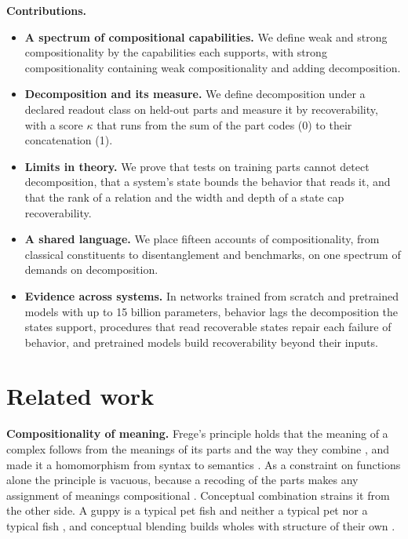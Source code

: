 \textbf{Contributions.}
\begin{itemize}
  \item \textbf{A spectrum of compositional capabilities.} We define weak and strong compositionality by the capabilities each supports, with strong compositionality containing weak compositionality and adding decomposition.
  \item \textbf{Decomposition and its measure.} We define decomposition under a declared readout class on held-out parts and measure it by recoverability, with a score $\kappa$ that runs from the sum of the part codes (0) to their concatenation (1).
  \item \textbf{Limits in theory.} We prove that tests on training parts cannot detect decomposition, that a system's state bounds the behavior that reads it, and that the rank of a relation and the width and depth of a state cap recoverability.
  \item \textbf{A shared language.} We place fifteen accounts of compositionality, from classical constituents to disentanglement and benchmarks, on one spectrum of demands on decomposition.
  \item \textbf{Evidence across systems.} In networks trained from scratch and pretrained models with up to 15 billion parameters, behavior lags the decomposition the states support, procedures that read recoverable states repair each failure of behavior, and pretrained models build recoverability beyond their inputs.
\end{itemize}

\section{Related work}
\label{sec:related}

\textbf{Compositionality of meaning.} Frege's principle holds that the meaning of a complex follows from the meanings of its parts and the way they combine \citep{frege1923}, and \citet{montague1970} made it a homomorphism from syntax to semantics \citep[see][]{janssen1997}. As a constraint on functions alone the principle is vacuous, because a recoding of the parts makes any assignment of meanings compositional \citep{zadrozny1994}. Conceptual combination strains it from the other side. A guppy is a typical pet fish and neither a typical pet nor a typical fish \citep{osherson1981}, and conceptual blending builds wholes with structure of their own \citep{fauconnier2002}.

